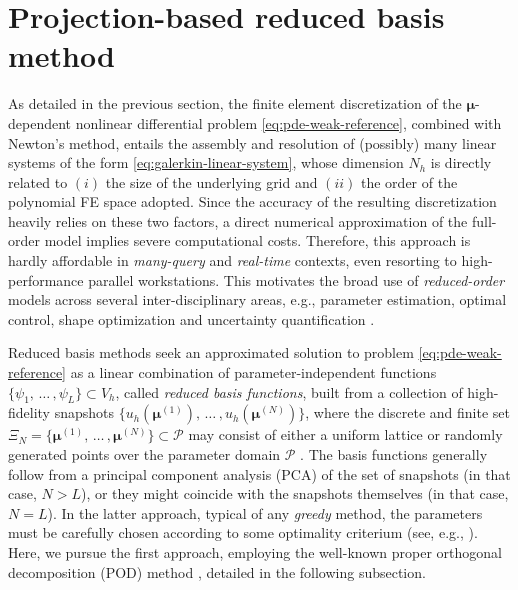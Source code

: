 \documentclass{elsarticle}
\numberwithin{equation}{section}
\theoremstyle{theorem}
\theoremstyle{definition}
\theoremstyle{remark}
\theoremstyle{proposition}
\numberwithin{figure}{section}
\newcommand{\bg}[1]{\boldsymbol{#1}}
\begin{document}
		
	
	\section{Projection-based reduced basis method}
	\label{section:Projection-based reduced basis method}
	
		As detailed in the previous section, the finite element discretization of the $\bg{\mu}$-dependent nonlinear differential problem \eqref{eq:pde-weak-reference}, combined with Newton's method, entails the assembly and resolution of (possibly) many linear systems of the form \eqref{eq:galerkin-linear-system}, whose dimension $N_h$ is directly related to $(i)$ the size of the underlying grid and $(ii)$ the order of the polynomial FE space adopted. Since the accuracy of the resulting discretization heavily relies on these two factors, a direct numerical approximation of the full-order model implies severe computational costs. Therefore, this approach is hardly affordable in \emph{many-query} and \emph{real-time} contexts, even resorting to high-performance parallel workstations. %
		This motivates the broad use of \emph{reduced-order} models across several inter-disciplinary areas, e.g., parameter estimation, optimal control, shape optimization and uncertainty quantification \cite{HSR16, QMN15}. 
						
		Reduced basis methods seek an approximated solution to problem \eqref{eq:pde-weak-reference} as a linear combination of parameter-independent functions $\big\lbrace \psi_1, \, \ldots \, , \psi_L \big\rbrace \subset V_h$, called \emph{reduced basis functions}, built from a collection of high-fidelity snapshots $\big\lbrace u_h \left( \bg{\mu}^{(1)} \right), \, \ldots \, , u_h \left( \bg{\mu}^{(N)} \right) \big\rbrace$, where the discrete and finite set $\Xi_N = \big\lbrace \bg{\mu}^{(1)}, \, \ldots \, , \bg{\mu}^{(N)} \big\rbrace \subset \mathcal{P}$ may consist of either a uniform lattice or randomly generated points over the parameter domain $\mathcal{P}$ \cite{HSR16}. The basis functions  generally follow from a principal component analysis (PCA) of the set of snapshots (in that case, $N > L$), or they might coincide with the snapshots themselves (in that case, $N = L$). In the latter approach, typical of any \emph{greedy} method, the parameters \smash{$\big\lbrace \bg{\mu}^{(n)} \big\rbrace_{1 \leq n \leq N}$} must be carefully chosen according to some optimality criterium (see, e.g., \cite{Chen17}). Here, we pursue the first approach, employing the well-known proper orthogonal decomposition (POD) method \cite{Lia02, Vol08}, detailed in the following subsection.
		
\end{document}
